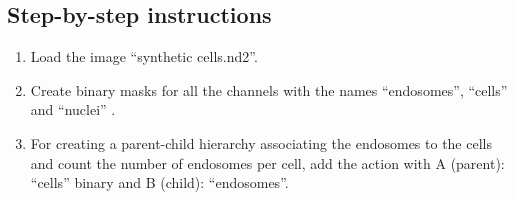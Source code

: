 \subsection*{Step-by-step instructions}

\begin{enumerate}
    \item Load the image ``synthetic cells.nd2''.

    \item Create binary masks for all the channels with the names ``endosomes'', ``cells'' and ``nuclei'' . 

    \item For creating a parent-child hierarchy associating the endosomes to the cells and count the number of endosomes per cell, add the action  with A (parent): ``cells'' binary and B (child): ``endosomes''. 




\end{enumerate}
